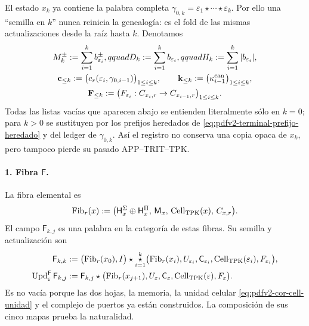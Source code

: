 El estado \(x_k\) ya contiene la palabra completa
\(\gamma_{0,k}=\varepsilon_1\star\cdots\star\varepsilon_k\). Por ello una
``semilla en \(k\)'' nunca reinicia la genealogía: es el fold de las mismas
actualizaciones desde la raíz hasta \(k\). Denotamos
\begin{equation}
\label{eq:pdfv2-terminal-prefijo-heredado}
 \begin{gathered}
 M_k^\pm:=\sum_{i=1}^{k}b_{\varepsilon_i}^\pm,qquad
 D_k:=\sum_{i=1}^{k}b_{\varepsilon_i},qquad
 H_k:=\sum_{i=1}^{k}|b_{\varepsilon_i}|,\\
 \mathbf c_{\leq k}:=
  \bigl(c_r(\varepsilon_i,\gamma_{0,i-1})\bigr)_{1\leq i\leq k},
 \qquad
 \mathbf k_{\leq k}:=
  \bigl(\kappa_{i-1}^{\rm can}\bigr)_{1\leq i\leq k},\\
 \mathbf F_{\leq k}:=
  \bigl(F_{\varepsilon_i}:C_{x_i,r}\to C_{x_{i-1},r}\bigr)_{1\leq i\leq k}.
 \end{gathered}
\end{equation}
Todas las listas vacías que aparecen abajo se entienden literalmente sólo
en \(k=0\); para \(k>0\) se sustituyen por los prefijos heredados de
\eqref{eq:pdfv2-terminal-prefijo-heredado} y del ledger de
\(\gamma_{0,k}\). Así el registro no conserva una copia opaca de \(x_k\),
pero tampoco pierde su pasado APP--TRIT--TPK.

\paragraph{1. Fibra \(\mathsf F\).}
La fibra elemental es
\begin{equation}
\label{eq:pdfv2-terminal-tipo-fibra}
 \operatorname{Fib}_r(x):=
 \bigl(\mathsf H_x^\Sigma\oplus\mathsf H_x^\Pi,\,
       \mathsf M_x,\,
       \operatorname{Cell}_{\rm TPK}(x),\,C_{x,r}\bigr).
\end{equation}
El campo \(\mathsf F_{k,j}\) es una palabra en la categoría de estas fibras.
Su semilla y actualización son
\begin{align}
 \mathsf F_{k,k}
 &:=\bigl(\operatorname{Fib}_r(x_0),I\bigr)\star
 \mathop{\star}_{i=1}^{k}
 \bigl(\operatorname{Fib}_r(x_i),U_{\varepsilon_i},
 \mathsf C_{\varepsilon_i},\operatorname{Cell}_{\rm TPK}(\varepsilon_i),
 F_{\varepsilon_i}\bigr),
 \label{eq:pdfv2-terminal-semilla-f}\\
 \operatorname{Upd}^{\mathsf F}_{\varepsilon}\mathsf F_{k,j}
 &:=
 \mathsf F_{k,j}\star
 \bigl(\operatorname{Fib}_r(x_{j+1}),U_\varepsilon,
 \mathsf C_\varepsilon,\operatorname{Cell}_{\rm TPK}(\varepsilon),
 F_\varepsilon\bigr).
 \label{eq:pdfv2-terminal-update-f}
\end{align}
Es no vacía porque las dos hojas, la memoria, la unidad celular
\eqref{eq:pdfv2-cor-cell-unidad} y el complejo de puertos ya están
construidos. La composición de sus cinco mapas prueba la naturalidad.

